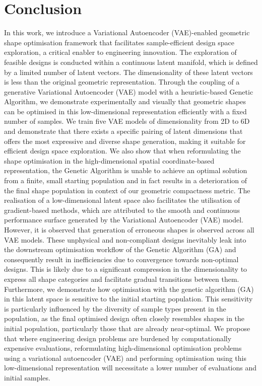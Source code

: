 \documentclass{article}
\begin{document}
\newpage{}
\section{Conclusion}

In this work, we introduce a Variational Autoencoder (VAE)-enabled geometric shape optimisation framework that facilitates sample-efficient design space exploration, a critical enabler to engineering innovation. The exploration of feasible designs is conducted within a continuous latent manifold, which is defined by a limited number of latent vectors. The dimensionality of these latent vectors is less than the original geometric representation.
Through the coupling of a generative Variational Autoencoder (VAE) model with a heuristic-based Genetic Algorithm, we demonstrate experimentally and visually that geometric shapes can be optimised in this low-dimensional representation efficiently with a fixed number of samples. We train five VAE models of dimensionality from 2D to 6D and demonstrate that there exists a specific pairing of latent dimensions that offers the most expressive and diverse shape generation, making it suitable for efficient design space exploration. We also show that when reformulating the shape optimisation in the high-dimensional spatial coordinate-based representation, the Genetic Algorithm is unable to achieve an optimal solution from a finite, small starting population and in fact results in a deterioration of the final shape population in context of our geometric compactness metric. 
The realisation of a low-dimensional latent space also facilitates the utilisation of gradient-based methods, which are attributed to the smooth and continuous performance surface generated by the Variational Autoencoder (VAE) model. However, it is observed that generation of erroneous shapes is observed across all VAE models. These unphysical and non-compliant designs inevitably leak into the downstream optimisation workflow of the Genetic Algorithm (GA) and consequently result in inefficiencies due to convergence towards non-optimal designs. This is likely due to a significant compression in the dimensionality to express all shape categories and facilitate gradual transitions between them.
Furthermore, we demonstrate how optimisation with the genetic algorithm (GA) in this latent space is sensitive to the initial starting population. This sensitivity is particularly influenced by the diversity of sample types present in the population, as the final optimised design often closely resembles shapes in the initial population, particularly those that are already near-optimal. We propose that where engineering design problems are burdened by computationally expensive evaluations, reformulating high-dimensional optimisation problems using a variational autoencoder (VAE) and performing optimisation using this low-dimensional representation will necessitate a lower number of evaluations and initial samples.
\end{document}
